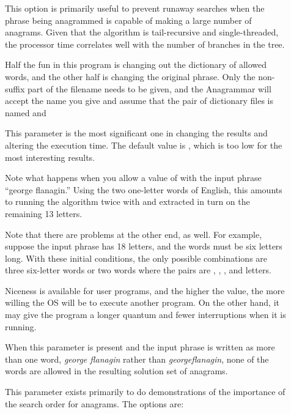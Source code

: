 \documentclass[letterpaper, 11pt]{article}
\begin{document}
\begin{description}
\item[] This option is primarily useful to prevent runaway searches
when the phrase being anagrammed is capable of making a large number of 
anagrams. Given that the algorithm is tail-recursive and single-threaded,
the processor time correlates well with the number of branches in the
tree.

\item[] Half the fun in this program is changing out
the dictionary of allowed words, and the other half is changing the
original phrase. Only the non-suffix part of the filename needs to
be given, and the Anagrammar will accept the name you give and assume
that the pair of dictionary files is named  and 
 
\item[] This parameter is the most significant one in
changing the results and altering the execution time. The default
value is , which is too low for the most interesting results. 

Note what happens when you allow a value of  with the input
phrase ``george flanagin.'' Using the two one-letter words of English,
this amounts to running the algorithm twice with  and  
extracted in turn on the remaining 13 letters. 

Note that there are problems at the other end, as well. For example,
suppose the input phrase has 18 letters, and the words must be six letters
long. With these initial conditions, the only possible combinations are three six-letter words
or two words where the pairs are , , , and  letters.

\item[] Niceness is available for user programs, and the
higher the value, the more willing the OS will be to execute another
program. On the other hand, it may give the program a longer quantum and
fewer interruptions when it is running. 

\item[] When this parameter is present and the input
phrase is written as more than one word, \ie \emph{george flanagin} 
rather than \emph{georgeflanagin}, none of the words are allowed 
in the resulting solution set of anagrams.

\item[] This parameter exists primarily to do demonstrations
of the importance of the search order for anagrams. The options are:


\end{description}
\end{document}
